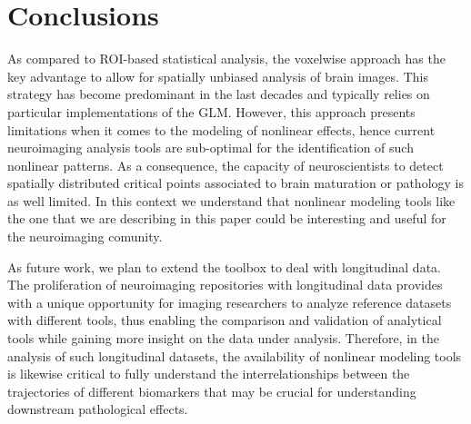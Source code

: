 \documentclass{article}
\begin{document}
\section{Conclusions}

As compared to ROI-based statistical analysis, the voxelwise approach has the key advantage to allow for spatially unbiased analysis of brain images. This strategy has become predominant in the last decades and typically relies on particular implementations of the GLM. However, this approach presents limitations when it comes to the modeling of nonlinear effects, hence current neuroimaging analysis tools are sub-optimal for the identification of such nonlinear patterns. As a consequence, the capacity of neuroscientists to detect spatially distributed critical points associated to brain maturation or pathology is as well limited. In this context we understand that nonlinear modeling tools like the one that we are describing in this paper could be  interesting and useful for the neuroimaging comunity. 

As future work, we plan to extend the toolbox to deal with longitudinal data. The proliferation of neuroimaging repositories with longitudinal data provides with a unique opportunity for imaging researchers to analyze reference datasets with different tools, thus enabling the comparison and validation of analytical tools while gaining more insight on the data under analysis. Therefore, in the analysis of such longitudinal datasets, the availability of nonlinear modeling tools is likewise critical to fully understand the interrelationships between the trajectories of different biomarkers that may be crucial for understanding downstream pathological effects.



\newpage
\small

\nocite{statistics_Hastie_2009}
\nocite{tutorial_SVR}



\end{document}
